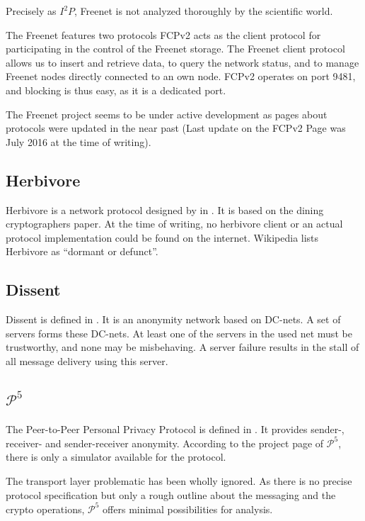 Precisely as $I^2P$, Freenet is not analyzed thoroughly by the scientific world. 

The Freenet features two protocols FCPv2 acts as the client protocol for participating in the control of the Freenet storage. The Freenet client protocol allows us to insert and retrieve data, to query the network status, and to manage Freenet nodes directly connected to an own node. FCPv2 operates on port 9481, and blocking is thus easy, as it is a dedicated port. 

The Freenet project seems to be under active development as pages about protocols were updated in the near past (Last update on the FCPv2 Page was July  2016 at the time of writing).

\subsection{Herbivore}
Herbivore is a network protocol designed by \citeauthor{herbivore:tr} in \cite{herbivore:tr}. It is based on the dining cryptographers paper\cite{chaum-dc}. At the time of writing, no herbivore client or an actual protocol implementation could be found on the internet. Wikipedia lists Herbivore as ``dormant or defunct''.

\subsection{Dissent}
Dissent is defined in \cite{Corrigan-Gibbs:2010:DAA:1866307.1866346}. It is an anonymity network based on DC-nets. A set of servers forms these DC-nets. At least one of the servers in the used net must be trustworthy, and none may be misbehaving. A server failure results in the stall of all message delivery using this server.

\subsection{\texorpdfstring{$\mathcal{P}^5$}{P5}}
The Peer-to-Peer Personal Privacy Protocol is defined in \cite{sherwood-protocol}. It provides sender-, receiver- and sender-receiver anonymity. According to the project page of $\mathcal{P}^5$, there is only a simulator available for the protocol.

The transport layer problematic has been wholly ignored. As there is no precise protocol specification but only a rough outline about the messaging and the crypto operations, $\mathcal{P}^5$ offers minimal possibilities for analysis.


